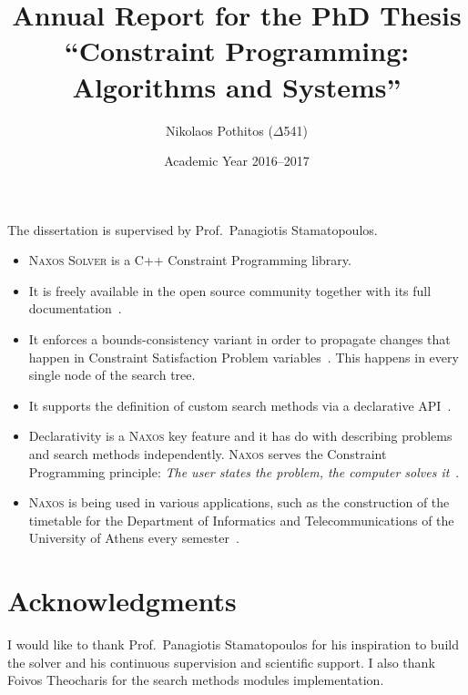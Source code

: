 \documentclass[a4paper]{article}
\begin{document}
\title{Annual Report for the PhD Thesis ``Constraint
       Programming: Algorithms and Systems''}

\author{Nikolaos Pothitos ($\Delta$541)}


\date{Academic Year 2016--2017}

\maketitle

The dissertation is supervised by Prof.~Panagiotis
Stamatopoulos.

\begin{itemize}
  \item \textsc{Naxos Solver} is a C++ Constraint
        Programming library.
  \item It is freely available in the open source community
        together with its full documentation~\cite{Naxos}.
  \item It enforces a bounds-consistency variant in order to
        propagate changes that happen in Constraint
        Satisfaction Problem variables~\cite{Bessiere2006}.
        This happens in every single node of the search
        tree.
  \item It supports the definition of custom search methods
        via a declarative API~\cite{Pothitos2017}.
  \item Declarativity is a \textsc{Naxos} key feature and it
        has do with describing problems and search methods
        independently. \textsc{Naxos} serves the Constraint
        Programming principle: \emph{The user states the
        problem, the computer solves it}~\cite{Freuder2014}.
  \item \textsc{Naxos} is being used in various
        applications, such as the construction of the
        timetable for the Department of Informatics and
        Telecommunications of the University of Athens every
        semester~\cite{Pothitos2012-Scheduling}.
\end{itemize}

\section*{Acknowledgments}

I would like to thank Prof.~Panagiotis Stamatopoulos for his
inspiration to build the solver and his continuous
supervision and scientific support. I also thank Foivos
Theocharis for the search methods modules implementation.



\end{document}
